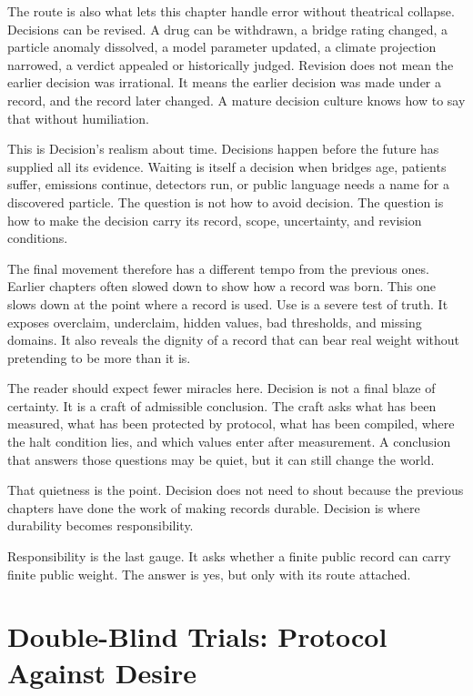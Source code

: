 \begin{chapteressay}
The route is also what lets this chapter handle error without theatrical
collapse. Decisions can be revised. A drug can be withdrawn, a bridge rating
changed, a particle anomaly dissolved, a model parameter updated, a climate
projection narrowed, a verdict appealed or historically judged. Revision does
not mean the earlier decision was irrational. It means the earlier decision
was made under a record, and the record later changed. A mature decision
culture knows how to say that without humiliation.

This is Decision's realism about time. Decisions happen before the future
has supplied all its evidence. Waiting is itself a decision when bridges age,
patients suffer, emissions continue, detectors run, or public language needs
a name for a discovered particle. The question is not how to avoid decision.
The question is how to make the decision carry its record, scope, uncertainty,
and revision conditions.

The final movement therefore has a different tempo from the previous ones.
Earlier chapters often slowed down to show how a record was born. This one
slows down at the point where a record is used. Use is a severe test of truth.
It exposes overclaim, underclaim, hidden values, bad thresholds, and missing
domains. It also reveals the dignity of a record that can bear real weight
without pretending to be more than it is.

The reader should expect fewer miracles here. Decision is not a final blaze
of certainty. It is a craft of admissible conclusion. The craft asks what has
been measured, what has been protected by protocol, what has been compiled,
where the halt condition lies, and which values enter after measurement. A
conclusion that answers those questions may be quiet, but it can still change
the world.

That quietness is the point. Decision does not need to shout because
the previous chapters have done the work of making records durable. Decision
is where durability becomes responsibility.

Responsibility is the last gauge.
It asks whether a finite public record can carry finite public weight.
The answer is yes, but only with its route attached.
\end{chapteressay}

\section{Double-Blind Trials: Protocol Against Desire}

